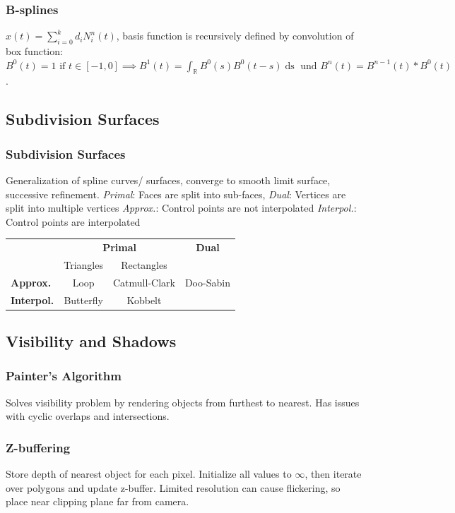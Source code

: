 \documentclass[a4paper,10pt]{article}
\renewcommand*{\arraystretch}{2}
\begin{document}
\subsubsection{B-splines}
\( x(t) = \sum_{i=0}^k d_i N_i^n (t) \), basis function is recursively defined by convolution of box function: 
\( B^0(t) = 1 \text{ if } t \in [-1, 0] \implies B^1(t) = \int_\mathbb{R} B^0(s) B^0(t-s) \mathop{ds} \text{ und } B^n(t) = B^{n-1}(t) * B^0(t)\).

\subsection{Subdivision Surfaces}
\subsubsection{Subdivision Surfaces} Generalization of spline curves/ surfaces, converge to smooth limit surface, successive refinement.
\textit{Primal}: Faces are split into sub-faces,
\textit{Dual}: Vertices are split into multiple vertices
\textit{Approx.}: Control points are not interpolated
\textit{Interpol.}: Control points are interpolated

\begin{center}
    \renewcommand{\arraystretch}{1.2}
\begin{tabularx}{\linewidth}{Xccc}
    \toprule
    & \multicolumn{2}{c}{\textbf{Primal}} & \textbf{Dual} \\
    & Triangles & Rectangles & \\
    \midrule
    \textbf{Approx.} & Loop & Catmull-Clark & Doo-Sabin \\
    \textbf{Interpol.} & Butterfly & Kobbelt & \\
    \bottomrule
\end{tabularx}
\end{center}

\subsection{Visibility and Shadows}
\subsubsection{Painter's Algorithm} Solves visibility problem by rendering objects from furthest to nearest. Has issues with cyclic overlaps and intersections.

\subsubsection{Z-buffering} Store depth of nearest object for each pixel. Initialize all values to \( \infty \), then iterate over polygons and update z-buffer.
Limited resolution can cause flickering, so place near clipping plane far from camera.
\end{document}
